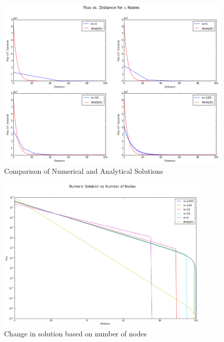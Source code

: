 \documentclass[10pt,peerreviewca]{IEEEtran} %
\begin{document}
	\begin{figure}
		\includegraphics[width=7in]{analytic_vs_numerical}
		\caption{Comparison of Numerical and Analytical Solutions}
		\label{fig:numerical_vs_analytical}
	\end{figure}

	\begin{figure}
		\begin{centering}
		\includegraphics[width=4in]{flux_vs_nodes_one_graph}
		\caption{Change in solution based on number of nodes}
		\label{fig:many nodes one chart}
		\end{centering}
	\end{figure}
\end{document}
